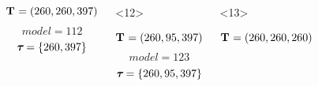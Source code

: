 \begin{frame}
\begin{columns}[c]
\begin{onlyenv}
\begin{minipage}[c][0.5\textheight][c]{\linewidth}
                \begin{displaybox}[0.95\linewidth]
                    \begin{minipage}[c][0.45\textheight][c]{0.95\linewidth}
                        \[
                            \mathbf{T_{}} = (260,260,397)
                        \]\vspace{0mm}
                        \[
                            model = 112
                        \]\vspace{0mm}
                        \[
                            \boldsymbol{\tau_{}} = \{260,397\}
                        \]\vspace{0mm}
                    \end{minipage}
                \end{displaybox}
            \end{minipage}
        \end{onlyenv}
        \begin{onlyenv}<12>
            \begin{minipage}[c][0.5\textheight][c]{\linewidth}
                \begin{displaybox}[0.95\linewidth]
                    \begin{minipage}[c][0.45\textheight][c]{0.95\linewidth}
                        \[
                            \mathbf{T_{}} = (260,95,397)
                        \]\vspace{0mm}
                        \[
                            model = 123
                        \]\vspace{0mm}
                        \[
                            \boldsymbol{\tau_{}} = \{260,95,397\}
                        \]\vspace{0mm}
                    \end{minipage}
                \end{displaybox}
            \end{minipage}
        \end{onlyenv}
        \begin{onlyenv}<13>
            \begin{minipage}[c][0.5\textheight][c]{\linewidth}
                \begin{displaybox}[0.95\linewidth]
                    \begin{minipage}[c][0.45\textheight][c]{0.95\linewidth}
                        \[
                            \mathbf{T_{}} = (260,260,260)
                        \]\vspace{0mm}

\end{minipage}
\end{displaybox}
\end{minipage}
\end{onlyenv}
\end{columns}
\end{frame}

